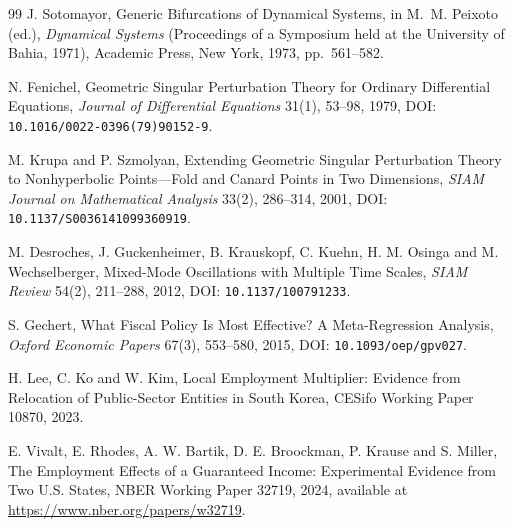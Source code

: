 \documentclass[review,12pt]{elsarticle}
\theoremstyle{plain}
\theoremstyle{definition}
\theoremstyle{remark}
\begin{document}
\begin{thebibliography}{99}
 J. Sotomayor, Generic Bifurcations of Dynamical Systems, in M.~M. Peixoto (ed.), \emph{Dynamical Systems} (Proceedings of a Symposium held at the University of Bahia, 1971), Academic Press, New York, 1973, pp.~561--582.

 N. Fenichel, Geometric Singular Perturbation Theory for Ordinary Differential Equations, \emph{Journal of Differential Equations} 31(1), 53--98, 1979, DOI: \texttt{10.1016/0022-0396(79)90152-9}.

 M. Krupa and P. Szmolyan, Extending Geometric Singular Perturbation Theory to Nonhyperbolic Points---Fold and Canard Points in Two Dimensions, \emph{SIAM Journal on Mathematical Analysis} 33(2), 286--314, 2001, DOI: \texttt{10.1137/S0036141099360919}.

 M. Desroches, J. Guckenheimer, B. Krauskopf, C. Kuehn, H. M. Osinga and M. Wechselberger, Mixed-Mode Oscillations with Multiple Time Scales, \emph{SIAM Review} 54(2), 211--288, 2012, DOI: \texttt{10.1137/100791233}.

 S. Gechert, What Fiscal Policy Is Most Effective? A Meta-Regression Analysis, \emph{Oxford Economic Papers} 67(3), 553--580, 2015, DOI: \texttt{10.1093/oep/gpv027}.

 H. Lee, C. Ko and W. Kim, Local Employment Multiplier: Evidence from Relocation of Public-Sector Entities in South Korea, CESifo Working Paper 10870, 2023.

 E. Vivalt, E. Rhodes, A. W. Bartik, D. E. Broockman, P. Krause and S. Miller, The Employment Effects of a Guaranteed Income: Experimental Evidence from Two U.S. States, NBER Working Paper 32719, 2024, available at \url{https://www.nber.org/papers/w32719}.

\end{thebibliography}
\end{document}

